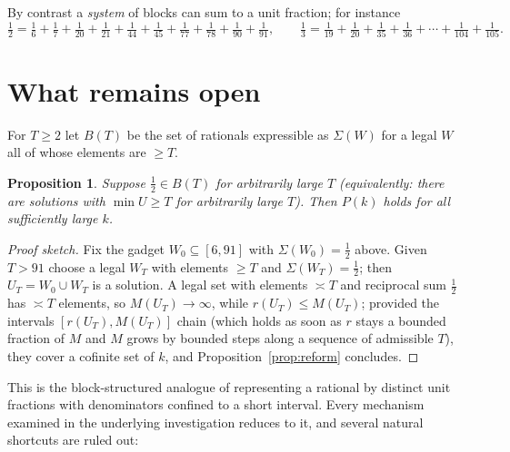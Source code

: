 \documentclass[11pt]{article}
\newtheorem{proposition}[theorem]{Proposition}
\theoremstyle{definition}
\begin{document}
By contrast a \emph{system} of blocks can sum to a unit fraction; for instance
\[
\tfrac12=\tfrac16+\tfrac17+\tfrac1{20}+\tfrac1{21}+\tfrac1{44}+\tfrac1{45}
+\tfrac1{77}+\tfrac1{78}+\tfrac1{90}+\tfrac1{91},
\qquad
\tfrac13=\tfrac1{19}+\tfrac1{20}+\tfrac1{35}+\tfrac1{36}+\cdots+\tfrac1{104}+\tfrac1{105}.
\]

\section{What remains open}\label{sec:open}

For $T\ge2$ let $B(T)$ be the set of rationals expressible as $\Sigma(W)$ for a legal $W$ all
of whose elements are $\ge T$.

\begin{proposition}\label{prop:reduction}
Suppose $\tfrac12\in B(T)$ for arbitrarily large $T$ (equivalently: there are solutions
with $\min U\ge T$ for arbitrarily large $T$). Then $P(k)$ holds for all sufficiently large
$k$.
\end{proposition}

\begin{proof}[Proof sketch]
Fix the gadget $W_0\subseteq[6,91]$ with $\Sigma(W_0)=\tfrac12$ above. Given $T>91$ choose a
legal $W_T$ with elements $\ge T$ and $\Sigma(W_T)=\tfrac12$; then $U_T=W_0\cup W_T$ is a
solution. A legal set with elements $\asymp T$ and reciprocal sum $\tfrac12$ has $\asymp T$
elements, so $M(U_T)\to\infty$, while $r(U_T)\le M(U_T)$; provided the intervals
$[r(U_T),M(U_T)]$ chain (which holds as soon as $r$ stays a bounded fraction of $M$ and $M$
grows by bounded steps along a sequence of admissible $T$), they cover a cofinite set of $k$,
and Proposition~\ref{prop:reform} concludes.
\end{proof}

\begin{center}
\end{center}

This is the block-structured analogue of representing a rational by distinct unit fractions
with denominators confined to a short interval. Every mechanism examined in the underlying
investigation reduces to it, and several natural shortcuts are ruled out:
\end{document}
